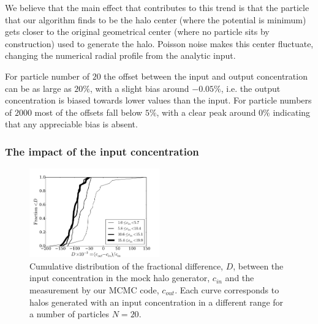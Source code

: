 \documentclass{emulateapj}
\begin{document}
We believe that the main effect that contributes to this trend
is that the particle that our algorithm finds to be the halo center
(where the potential is minimum) gets closer to the original
geometrical center (where no particle sits by construction) used to
generate the halo.  Poisson noise makes this center fluctuate,
changing the numerical radial profile from the analytic input.

For particle number of $20$ the offset between the input and output
concentration can be as large as $20\%$, with a slight bias around
$-0.05\%$, i.e. the output concentration is biased towards lower
values than the input.
For particle numbers of $2000$ most of the offsets fall below $5\%$,
with a clear peak around $0\%$ indicating that any appreciable bias is
absent.


\subsubsection{The impact of the input concentration}

\begin{figure}
\begin{center}
  \includegraphics[width=0.50\textwidth]{mock_percentual_diff_conc_20.pdf}
\end{center}
\caption{Cumulative distribution of the fractional difference, $D$, between
  the input concentration in the mock halo generator, $c_{in}$ and the
  measurement by our MCMC code, $c_{out}$. Each curve corresponds to
  halos generated with an input concentration in a different range for
  a number of particles $N=20$.
    \label{fig:results_mocks_conc_20}}
\end{figure}
\end{document}
